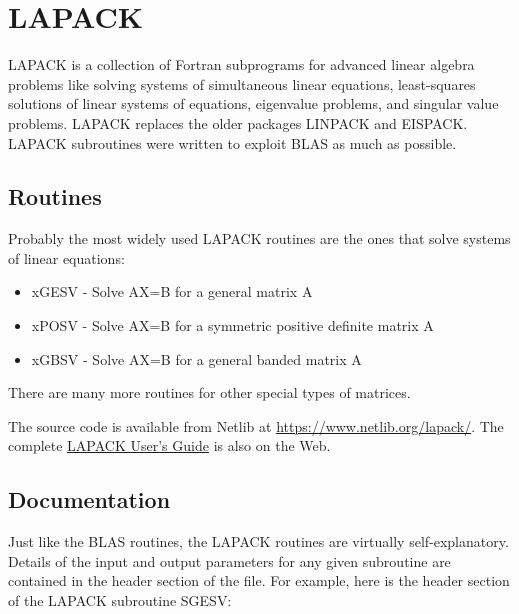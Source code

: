\section{LAPACK}

LAPACK is a collection of Fortran subprograms for advanced linear algebra problems like solving systems of simultaneous linear equations, least-squares solutions of linear systems of equations, eigenvalue problems, and singular value problems. LAPACK replaces the older packages LINPACK and EISPACK. LAPACK subroutines were written to exploit BLAS as much as possible.

\subsection{Routines}

Probably the most widely used LAPACK routines are the ones that solve systems of linear equations:

\begin{itemize}
    \item xGESV - Solve AX=B for a general matrix A
    \item xPOSV - Solve AX=B for a symmetric positive definite matrix A
    \item xGBSV - Solve AX=B for a general banded matrix A
\end{itemize}

There are many more routines for other special types of matrices.

The source code is available from Netlib at \url{https://www.netlib.org/lapack/}. The complete \href{https://www.netlib.org/lapack/lug/}{LAPACK User's Guide} is also on the Web.

\subsection{Documentation}

Just like the BLAS routines, the LAPACK routines are virtually self-explanatory. Details of the input and output parameters for any given subroutine are contained in the header section of the file. For example, here is the header section of the LAPACK subroutine SGESV:

